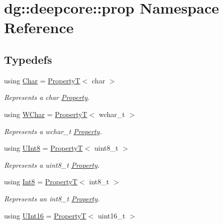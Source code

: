 \hypertarget{namespacedg_1_1deepcore_1_1prop}{}\section{dg\+:\+:deepcore\+:\+:prop Namespace Reference}
\label{namespacedg_1_1deepcore_1_1prop}
\subsection*{Typedefs}
\begin{DoxyCompactItemize}
\item 
using \hyperlink{group___process_properties_ga2ba635b306b0b9966b3b14da127b9fd4}{Char} = \hyperlink{structdg_1_1deepcore_1_1_property_t}{PropertyT}$<$ char $>$
\begin{DoxyCompactList}\small\item\em Represents a {\ttfamily char} \hyperlink{classdg_1_1deepcore_1_1_property}{Property}. \end{DoxyCompactList}\item 
using \hyperlink{group___process_properties_ga0259b5488d3e8eb0dca8d4ff630eb90f}{W\+Char} = \hyperlink{structdg_1_1deepcore_1_1_property_t}{PropertyT}$<$ wchar\+\_\+t $>$
\begin{DoxyCompactList}\small\item\em Represents a {\ttfamily wchar\+\_\+t} \hyperlink{classdg_1_1deepcore_1_1_property}{Property}. \end{DoxyCompactList}\item 
using \hyperlink{group___process_properties_ga00cfe1be5c63a967b6b7e7d518393d97}{U\+Int8} = \hyperlink{structdg_1_1deepcore_1_1_property_t}{PropertyT}$<$ uint8\+\_\+t $>$
\begin{DoxyCompactList}\small\item\em Represents a {\ttfamily uint8\+\_\+t} \hyperlink{classdg_1_1deepcore_1_1_property}{Property}. \end{DoxyCompactList}\item 
using \hyperlink{group___process_properties_gabc81c32ee6c2b6a9b8d3dead18f3d336}{Int8} = \hyperlink{structdg_1_1deepcore_1_1_property_t}{PropertyT}$<$ int8\+\_\+t $>$
\begin{DoxyCompactList}\small\item\em Represents an {\ttfamily int8\+\_\+t} \hyperlink{classdg_1_1deepcore_1_1_property}{Property}. \end{DoxyCompactList}\item 
using \hyperlink{group___process_properties_gad8c4325c24fef55f796a02753e8620af}{U\+Int16} = \hyperlink{structdg_1_1deepcore_1_1_property_t}{PropertyT}$<$ uint16\+\_\+t $>$

\end{DoxyCompactItemize}
